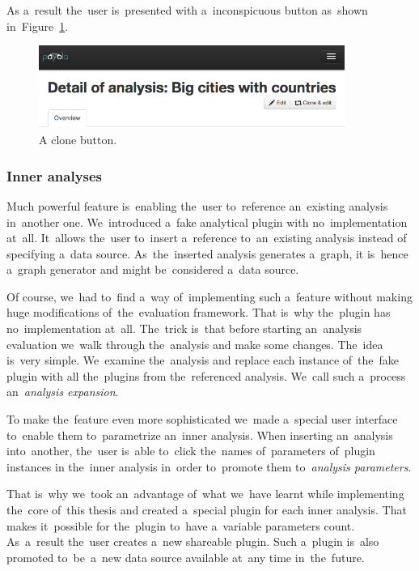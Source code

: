 As a~result the~user is~presented with a~inconspicuous button as~shown in~Figure~\ref{fig:clone-button}.

\begin{figure}
	\centering
	\includegraphics[width=100mm]{img/clone-button.png}
	\caption{A clone button.}
	\label{fig:clone-button}
\end{figure}

\subsubsection{Inner analyses}
Much powerful feature is~enabling the~user to~reference an~existing analysis in~another one. We~introduced a~fake analytical plugin with no~implementation at~all. It~allows the~user to~insert a~reference to~an~existing analysis instead 
of specifying a~data source. As~the~inserted analysis generates a~graph, 
it is~hence a~graph generator and might be~considered a~data source.

Of course, we~had to~find a~way of~implementing such a~feature without 
making huge modifications of~the~evaluation framework. That is~why the~plugin 
has no~implementation at~all. The~trick is~that before starting an~analysis 
evaluation we~walk through the~analysis and make some changes. The~idea is~very 
simple. We~examine the~analysis and replace each instance of~the~fake plugin 
with all the~plugins from the~referenced analysis. We~call such a~process an~\emph{analysis expansion}.

To make the~feature even more sophisticated we~made a~special user interface to~enable them to~parametrize an~inner analysis. When inserting an~analysis into~another, the~user is~able to~click the~names of~parameters of~plugin instances 
in the~inner analysis in~order to~promote them to~\emph{analysis parameters}.

That is~why we~took an~advantage of~what we~have learnt while implementing the~core of~this thesis and created a~special plugin for each inner analysis. That 
makes it~possible for the~plugin to~have a~variable parameters count. As~a~result the~user creates a~new shareable plugin. Such a~plugin is~also promoted to~be~a~new 
data source available at~any time in~the~future.

